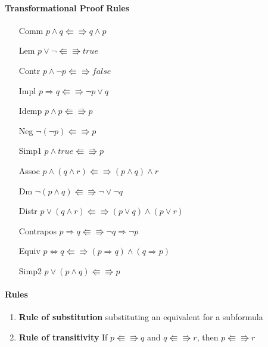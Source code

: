 \documentclass[12pt]{report}
\begin{document}
      \paragraph{Transformational Proof Rules}
      \begin{itemize}
        \item[Comm] $p\land q \Lleftarrow\Rrightarrow q\land p$
        \item[Lem] $p\lor\lnot \Lleftarrow\Rrightarrow true$
        \item[Contr] $p\land\lnot p\Lleftarrow\Rrightarrow false$
        \item[Impl] $p \Rightarrow q\Lleftarrow\Rrightarrow \lnot p \lor q$
        \item[Idemp] $p \land p\Lleftarrow\Rrightarrow p$
        \item[Neg] $\lnot(\lnot p)\Lleftarrow\Rrightarrow p$
        \item[Simp1] $p\land true\Lleftarrow\Rrightarrow p$
        \item[Assoc] $p \land (q \land r)\Lleftarrow\Rrightarrow (p \land q)
          \land r$
        \item[Dm] $\lnot(p\land q)\Lleftarrow\Rrightarrow \lnot \lor \lnot q$
        \item[Distr] $p \lor (q \land r)\Lleftarrow\Rrightarrow (p \lor q)
          \land (p \lor r)$
        \item[Contrapos] $p \Rightarrow q\Lleftarrow\Rrightarrow \lnot q
          \Rightarrow \lnot p$
        \item[Equiv] $p \Leftrightarrow q\Lleftarrow\Rrightarrow (p\Rightarrow
          q) \land (q \Rightarrow p)$
        \item[Simp2] $p \lor (p \land q)\Lleftarrow\Rrightarrow p$
      \end{itemize}

    \paragraph{Rules}
      \begin{enumerate}
        \item \textbf{Rule of substitution} substituting an equivalent for a
          subformula
        \item \textbf{Rule of transitivity} If $p\Lleftarrow\Rrightarrow q$ and
          $q\Lleftarrow\Rrightarrow r$, then $p\Lleftarrow\Rrightarrow r$
      \end{enumerate}
\end{document}
